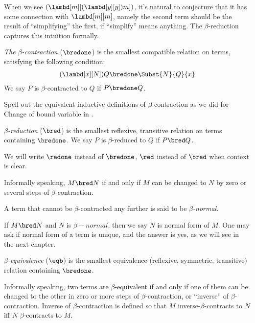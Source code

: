 \documentclass[../../../include/open-logic-section]{subfiles}
\begin{document}

When we see $(\lambd[m][(\lambd[y][y]) m])$, it's natural to
conjecture that it has some connection with $\lambd[m][m]$,
namely the second term should be the result of ``simplifying'' the first, if
``simplify'' means anything. The $\beta$-reduction captures this
intuition formally.

\begin{defn} 
  \emph{The $\beta$-contraction} ($\bredone$) is the smallest compatible
  relation on terms, satisfying the following condition:
  \begin{align*}
    (\lambd[x][N])Q \bredone \Subst{N}{Q}{x} 
  \end{align*}
  We say $P$ is $\beta$-contracted to $Q$ if $P \bredone Q$. 
\end{defn}

\begin{prob} 
  Spell out the equivalent inductive definitions of $\beta$-contraction as we
  did for Change of bound variable in .
\end{prob}
  
\begin{defn} 
  \emph{$\beta$-reduction} ($\bred$) is the smallest reflexive, transitive
  relation on terms containing $\bredone$.
  We say $P$ is $\beta$-reduced to $Q$ if $P \bred Q$.
\end{defn}
We will write $\redone$ instead of $\bredone$, $\red$ instead of
$\bred$ when context is clear.

Informally speaking, $M \bred N$  if and only if $M$ can be changed to
$N$ by zero or several steps of $\beta$-contraction.

\begin{defn}
A term that cannot be $\beta$-contracted any further is said to be
\emph{$\beta$-normal}. 
\end{defn}
If $M \bred N$ and $N$ is $\beta-normal$, then we say $N$ is normal
form of $M$. One may ask if normal form of a term is unique, and the
answer is yes, as we will see in the next chapter.

\begin{defn}
  \emph{$\beta$-equivalence} ($\eqb$) is the smallest equivalence (reflexive,
  symmetric, transitive) relation containing $\bredone$.
\end{defn}
Informally speaking, two terms are $\beta$-equivalent if and only if
one of them can be changed to the other in zero or more steps of
$\beta$-contraction, or ``inverse'' of $\beta$-contraction. Inverse of
$\beta$-contraction is defined so that $M$ inverse-$\beta$-contracts to $N$
iff $N$ $\beta$-contracts to $M$.
\end{document}

